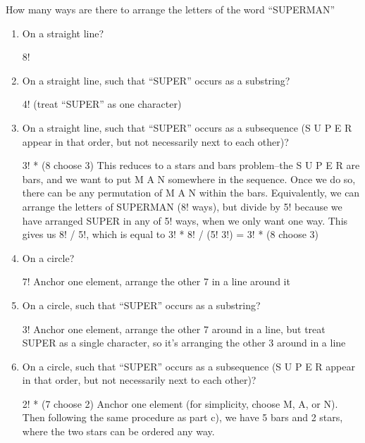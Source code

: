 \question How many ways are there to arrange the letters of the word 
“SUPERMAN”
\begin{enumerate}[label=(\alph*)]
 \item On a straight line?
\begin{solution} 8! \end{solution}

\item On a straight line, such that “SUPER” occurs as a substring?
\begin{solution} 4! (treat “SUPER” as one character) \end{solution}

\item On a straight line, such that “SUPER” occurs as a subsequence 
(S U P E R appear in that order, but not necessarily next to each other)? 
\begin{solution} 3! * (8 choose 3)
This reduces to a stars and bars problem--the S U P E R are bars, and 
we want to put M A N somewhere in the sequence. Once we do so, there 
can be any permutation of M A N within the bars.
Equivalently, we can arrange the letters of SUPERMAN (8! ways), but 
divide by 5! because we have arranged SUPER in any of 5! ways, when 
we only want one way. This gives us 8! / 5!, which is equal to 
3! * 8! / (5! 3!) = 3! * (8 choose 3)
 \end{solution}


\item On a circle? 
\begin{solution} 7!
    Anchor one element, arrange the other 7 in a line around it
 \end{solution}


\item On a circle, such that “SUPER” occurs as a substring?
\begin{solution} 3!
Anchor one element, arrange the other 7 around in a line, but treat 
SUPER as a single character, so it’s arranging the other 3 around in 
a line  \end{solution}

\item On a circle, such that “SUPER” occurs as a subsequence (S U P E R 
appear in that order, but not necessarily next to each other)?
\begin{solution} 2! * (7 choose 2)
Anchor one element (for simplicity, choose M, A, or N). Then following 
the same procedure as part c), we have 5 bars and 2 stars, where the 
two stars can be ordered any way. \end{solution}

\end{enumerate}